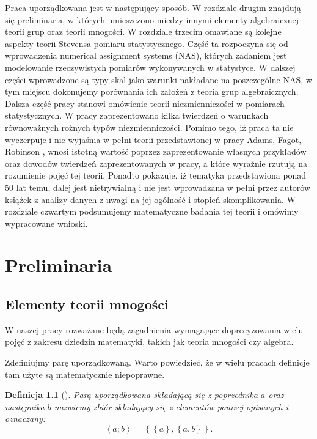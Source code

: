 \documentclass[12pt,a4paper]{report}
\newtheorem{definition}{Definicja}[chapter]
\newcommand{\parauporzadkowana}[2]{\left\langle {#1}; {#2} \right\rangle}
\newcommand{\zbior}[1]{\left\lbrace {#1} \right\rbrace }
\begin{document}
Praca uporządkowana jest w następujący sposób. W rozdziale drugim znajdują się preliminaria, w których umieszczono miedzy innymi elementy algebraicznej teorii grup oraz teorii mnogości. W rozdziale trzecim omawiane są kolejne aspekty teorii Stevensa pomiaru statystycznego. Część ta rozpoczyna się od wprowadzenia numerical assignment systems (NAS), których zadaniem jest modelowanie rzeczywistych pomiarów wykonywanych w statystyce. W dalszej części wprowadzone są typy skal jako warunki nakładane na poszczególne NAS, w tym miejscu dokonujemy porównania ich założeń z teoria grup algebraicznych. Dalsza część pracy stanowi omówienie teorii niezmienniczości w pomiarach statystycznych. W pracy zaprezentowano kilka twierdzeń o warunkach równoważnych rożnych typów niezmienniczości. Pomimo tego, iż praca ta nie wyczerpuje i nie wyjaśnia w pełni teorii przedstawionej w pracy Adams, Fagot, Robinson {\citep{adams1965theory}}, wnosi istotną wartość poprzez zaprezentowanie własnych przykładów oraz dowodów twierdzeń zaprezentowanych w pracy, a które wyraźnie rzutują na rozumienie pojęć tej teorii. Ponadto pokazuje, iż tematyka przedstawiona ponad 50 lat temu, dalej jest nietrywialną i nie jest wprowadzana w pełni przez autorów książek z analizy danych z uwagi na jej ogólność i stopień skomplikowania. W rozdziale czwartym podsumujemy  matematyczne badania tej teorii i omówimy wypracowane wnioski.

\chapter{Preliminaria}


\section{Elementy teorii mnogości}
W naszej pracy rozważane będą zagadnienia wymagające doprecyzowania wielu pojęć z zakresu dziedzin matematyki, takich jak teoria mnogości czy algebra. 


Zdefiniujmy parę uporządkowaną. Warto powiedzieć, że w wielu pracach definicje tam użyte są matematycznie niepoprawne.

\begin{definition}[{\citep[Sec 3.3]{kuratowski1966wstkep}}]
Parą uporządkowana składającą się z poprzednika $a$ oraz następnika $b$ nazwiemy zbiór składający się z elementów poniżej opisanych i oznaczany:
\begin{equation*}
\parauporzadkowana{a}{b}=\zbior{\zbior{a}, \zbior{a,b}}.
\end{equation*}

\end{definition}
\end{document}
